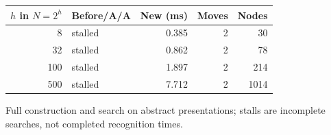 \begin{center}\small
\begin{tabular}{@{}rlrrr@{}}
\toprule
$h$ in $N=2^h$ & Before/A/A & New (ms) & Moves & Nodes \\
\midrule
8 & stalled & 0.385 & 2 & 30 \\
32 & stalled & 0.862 & 2 & 78 \\
100 & stalled & 1.897 & 2 & 214 \\
500 & stalled & 7.712 & 2 & 1014 \\
\bottomrule
\end{tabular}
\end{center}
Full construction and search on abstract presentations; stalls are incomplete searches, not completed recognition times.
